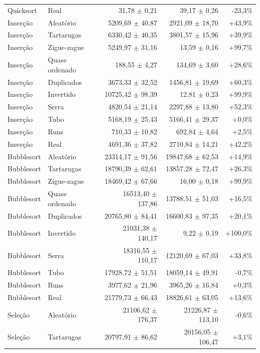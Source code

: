 \begin{table}[ht]
\begin{tabular}{llrrr}
Quicksort & Real & 31,78 $\pm$ 0,21 & 39,17 $\pm$ 0,26 & -23,3\% \\
Inserção & Aleatório & 5209,69 $\pm$ 40,87 & 2921,09 $\pm$ 18,70 & +43,9\% \\
Inserção & Tartarugas & 6330,42 $\pm$ 40,35 & 3801,57 $\pm$ 15,96 & +39,9\% \\
Inserção & Zigue-zague & 5249,97 $\pm$ 31,16 & 13,59 $\pm$ 0,16 & +99,7\% \\
Inserção & Quase ordenado & 188,55 $\pm$ 4,27 & 134,69 $\pm$ 3,60 & +28,6\% \\
Inserção & Duplicados & 3673,33 $\pm$ 32,52 & 1456,81 $\pm$ 19,69 & +60,3\% \\
Inserção & Invertido & 10725,42 $\pm$ 98,39 & 12,81 $\pm$ 0,23 & +99,9\% \\
Inserção & Serra & 4820,54 $\pm$ 21,14 & 2297,88 $\pm$ 13,80 & +52,3\% \\
Inserção & Tubo & 5168,19 $\pm$ 25,43 & 5166,41 $\pm$ 29,37 & +0,0\% \\
Inserção & Runs & 710,33 $\pm$ 10,82 & 692,84 $\pm$ 4,64 & +2,5\% \\
Inserção & Real & 4691,36 $\pm$ 37,82 & 2710,84 $\pm$ 14,21 & +42,2\% \\
Bubblesort & Aleatório & 23314,17 $\pm$ 91,56 & 19847,68 $\pm$ 62,53 & +14,9\% \\
Bubblesort & Tartarugas & 18790,39 $\pm$ 62,61 & 13857,28 $\pm$ 72,47 & +26,3\% \\
Bubblesort & Zigue-zague & 18469,42 $\pm$ 67,66 & 16,00 $\pm$ 0,18 & +99,9\% \\
Bubblesort & Quase ordenado & 16513,40 $\pm$ 137,86 & 13788,51 $\pm$ 51,03 & +16,5\% \\
Bubblesort & Duplicados & 20765,80 $\pm$ 84,41 & 16600,83 $\pm$ 97,35 & +20,1\% \\
Bubblesort & Invertido & 21031,38 $\pm$ 140,17 & 9,22 $\pm$ 0,19 & +100,0\% \\
Bubblesort & Serra & 18316,55 $\pm$ 110,17 & 12120,69 $\pm$ 67,03 & +33,8\% \\
Bubblesort & Tubo & 17928,72 $\pm$ 51,51 & 18059,14 $\pm$ 49,91 & -0,7\% \\
Bubblesort & Runs & 3977,62 $\pm$ 21,96 & 3965,26 $\pm$ 16,84 & +0,3\% \\
Bubblesort & Real & 21779,73 $\pm$ 66,43 & 18826,61 $\pm$ 63,05 & +13,6\% \\
Seleção & Aleatório & 21106,62 $\pm$ 176,37 & 21226,87 $\pm$ 113,10 & -0,6\% \\
Seleção & Tartarugas & 20797,91 $\pm$ 86,62 & 20156,05 $\pm$ 106,47 & +3,1\% \\

\end{tabular}
\end{table}
